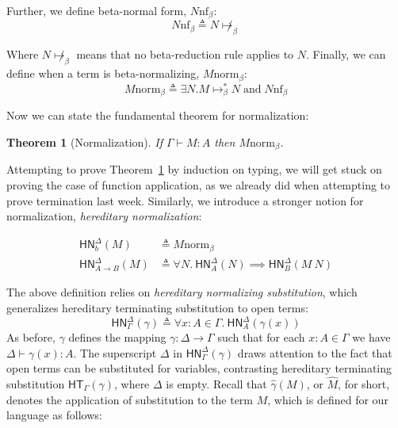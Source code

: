 \documentclass{article}
\newtheorem{thm}{Theorem}
\newcommand{\hasEF}[3]{\ensuremath{#1 \vdash #2 : #3}}
\newcommand{\hterm}[2]{\ensuremath{\mathsf{HT}_{#1}(#2)}}
\newcommand{\contrb}[2]{#1 \mathrel{\text{contr}_\beta} #2}
\newcommand{\bnf}[1]{#1 \mathrel{\text{nf}_\beta}}
\newcommand{\bnorm}[1]{\ensuremath{#1 \mathrel{\text{norm}_\beta}}}
\newcommand{\stepb}[2]{\ensuremath{#1 \mapsto_{\beta} #2}}
\newcommand{\stepbs}[2]{\ensuremath{#1 \mapsto_{\beta}^* #2}}
\newcommand{\hnorm}[3]{\ensuremath{\mathsf{HN}^{#1}_{#2}(#3)}}
\newcommand{\fn}[2]{\ensuremath{#1 \to #2}}
\newcommand{\ap}[2]{\ensuremath{#1\ #2}}
\newcommand{\lam}[3]{\ensuremath{\lambda #1 {:} #2.\, #3}}
\begin{document}

Further, we define beta-normal form, $\bnf{N}$:
\[
\bnf{N} \triangleq N \not\mapsto_{\beta}
\]

Where $N \not\mapsto_{\beta}$ means that no beta-reduction rule applies to $N$.  Finally, we
can define when a term is beta-normalizing, $\bnorm{M}$:
\[
\bnorm{M} \triangleq \exists N. \stepbs{M}{N} \;\text{and}\; \bnf{N}
\]

Now we can state the fundamental theorem for normalization: 
\begin{thm}[Normalization]\label{thm:norm}
If $\hasEF{\Gamma}{M}{A}$ then $\bnorm{M}$.
\end{thm}

Attempting to prove Theorem~\ref{thm:norm} by induction on typing, we will get stuck on proving
the case of function application, as we already did when attempting to prove termination last
week.  Similarly, we introduce a stronger notion for normalization, \emph{hereditary normalization}:

\begin{align*}
  \hnorm{\Delta}{b}{M} &\triangleq \bnorm{M}\\
  \hnorm{\Delta}{\fn{A}{B}}{M} &\triangleq
  \forall N.\ \hnorm{\Delta}{A}{N} \implies \hnorm{\Delta}{B}{\ap{M}{N}}
\end{align*}

The above definition relies on \emph{hereditary normalizing substitution}, which generalizes
hereditary terminating substitution to open terms:
\[
\hnorm{\Delta}{\Gamma}{\gamma} \triangleq \forall x : A \in \Gamma.\ \hnorm{\Delta}{A}{\gamma(x)}
\]
As before, $\gamma$ defines the mapping $\gamma : \Delta \to \Gamma$ such that for each
$x : A \in \Gamma$ we have $\hasEF{\Delta}{\gamma(x)}{A}$.  The superscript $\Delta$ in
$\hnorm{\Delta}{\Gamma}{\gamma}$ draws attention to the fact that open terms can be substituted
for variables, contrasting hereditary terminating substitution $\hterm{\Gamma}{\gamma}$, where
$\Delta$ is empty.  Recall that $\hat{\gamma}(M)$, or $\hat{M}$, for short, denotes the application
of substitution to the term $M$, which is defined for our language as follows:
\end{document}
